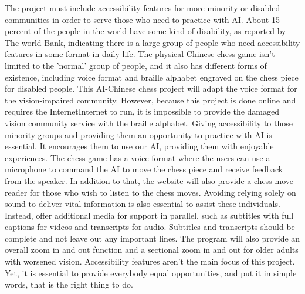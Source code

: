 \documentclass[10pt,twocolumn]{article}
\begin{document}
	The project must include accessibility features for more minority or disabled communities in order to serve those who need to practice with AI. About 15 percent of the people in the world have some kind of disability, as reported by The world Bank, indicating there is a large group of people who need accessibility features in some format in daily life\cite{WorldBank}. The physical Chinese chess game isn't limited to the 'normal' group of people, and it also has different forms of existence, including voice format and braille alphabet engraved on the chess piece for disabled people. This AI-Chinese chess project will adapt the voice format for the vision-impaired community. However, because this project is done online and requires the InternetInternet to run, it is impossible to provide the damaged vision community service with the braille alphabet. Giving accessibility to those minority groups and providing them an opportunity to practice with AI is essential. It encourages them to use our AI, providing them with enjoyable experiences. The chess game has a voice format where the users can use a microphone to command the AI to move the chess piece and receive feedback from the speaker. In addition to that, the website will also provide a chess move reader for those who wish to listen to the chess moves. Avoiding relying solely on sound to deliver vital information is also essential to assist these individuals. Instead, offer additional media for support in parallel, such as subtitles with full captions for videos and transcripts for audio. Subtitles and transcripts should be complete and not leave out any important lines. The program will also provide an overall zoom in and out function and a sectional zoom in and out for older adults with worsened vision. Accessibility features aren't the main focus of this project. Yet, it is essential to provide everybody equal opportunities, and put it in simple words, that is the right thing to do. 
	
\end{document}
